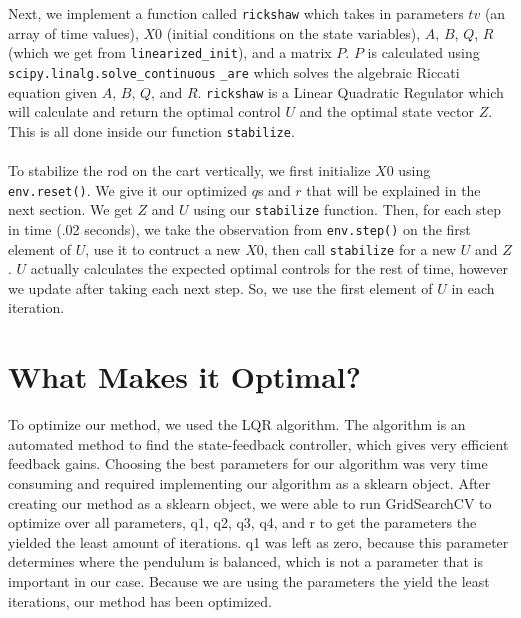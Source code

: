\documentclass{hitec}
\begin{document}
	Next, we implement a function called \texttt{rickshaw} which takes in parameters $tv$ (an array of time values), $X0$ (initial conditions on the state variables), $A$, $B$, $Q$, $R$ (which we get from \texttt{linearized\_init}), and a matrix $P$. $P$ is calculated using \texttt{scipy.linalg.solve\_continuous} \texttt{\_are} which solves the algebraic Riccati equation given $A$, $B$, $Q$, and $R$. \texttt{rickshaw} is a Linear Quadratic Regulator which will calculate and return the optimal control $U$ and the optimal state vector $Z$. This is all done inside our function \texttt{stabilize}.\\\\
	To stabilize the rod on the cart vertically, we first initialize $X0$ using \texttt{env.reset()}. We give it our optimized $q$s and $r$ that will be explained in the next section. We get $Z$ and $U$ using our \texttt{stabilize} function. Then, for each step in time (.02 seconds), we take the observation from \texttt{env.step()} on the first element of $U$, use it to contruct a new $X0$, then call \texttt{stabilize} for a new $U$ and $Z$. $U$ actually calculates the expected optimal controls for the rest of time, however we update after taking each next step. So, we use the first element of $U$ in each iteration.
	
	\section{What Makes it Optimal?}	
	To optimize our method, we used the LQR algorithm. The algorithm is an automated method to find the state-feedback controller, which gives very efficient feedback gains. Choosing the best parameters for our algorithm was very time consuming and required implementing our algorithm as a sklearn object. After creating our method as a sklearn object, we were able to run GridSearchCV to optimize over all parameters, q1, q2, q3, q4, and r to get the parameters the yielded the least amount of iterations. q1 was left as zero, because this parameter determines where the pendulum is balanced, which is not a parameter that is important in our case. Because we are using the parameters the yield the least iterations, our method has been optimized.
	
\end{document}
